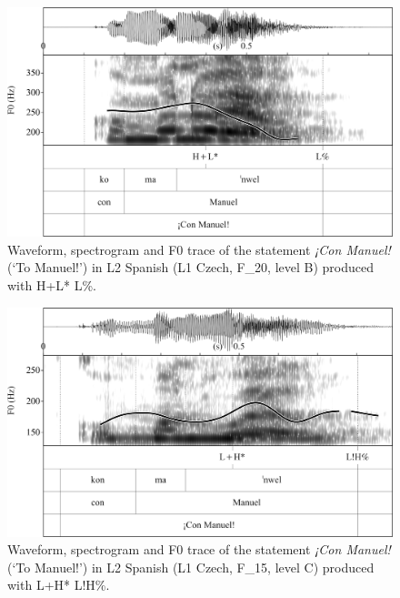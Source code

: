 \begin{figure}


\includegraphics[width=\textwidth]{figures/Figure_4.41.png}


\caption{Waveform, spectrogram and F0 trace of the statement \textit{¡Con Manuel!} (‘To Manuel!’) in L2 Spanish (L1 Czech, F\_20, level B) produced with H+L* L\%.}
\label{fig:4.41}
\end{figure}

\begin{figure}


\includegraphics[width=\textwidth]{figures/Figure_4.42.png}


\caption{Waveform, spectrogram and F0 trace of the statement \textit{¡Con Manuel!} (‘To Manuel!’) in L2 Spanish (L1 Czech, F\_15, level C) produced with L+H* L!H\%.}
\label{fig:4.42}
\end{figure}

